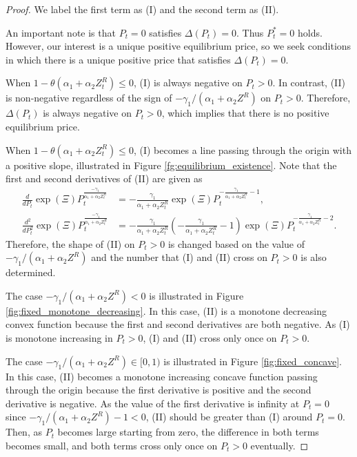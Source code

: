 \documentclass[11pt, a4paper]{article}
\theoremstyle{remark}
\begin{document}
\begin{proof}
We label the first term as (I) and the second term as (II).

An important note is that $P_t =0$ satisfies $\Delta(P_{t}) = 0$.
Thus $P_t^* = 0$ holds.
However, our interest is a unique positive equilibrium price, so we seek conditions in which there is a unique positive price that satisfies $\Delta(P_t)=0$.
    
When $1 - \theta (\alpha_1 + \alpha_2 Z^{R}_{t}) \le 0$, (I) is always negative on $P_t >0$. 
In contrast, (II) is non-negative regardless of the sign of $-\gamma_1/(\alpha_1+\alpha_2 Z^R)$ on $P_t > 0$.
Therefore, $\Delta(P_t)$ is always negative on $P_t>0$, which implies that there is no positive equilibrium price.

When $1 - \theta (\alpha_1 + \alpha_2 Z^{R}_{t}) \le 0$, (I) becomes a line passing through the origin with a positive slope, illustrated in Figure \ref{fg:equilibrium_existence}. 
Note that the first and second derivatives of (II) are given as
\begin{align}
    \frac{d}{dP_t}\exp(\Xi) P_t^{\frac{-\gamma_1}{\alpha_1 + \alpha_2 Z^{R}_{t}}} &= -\frac{\gamma_1}{\alpha_1 + \alpha_2 Z^R_t} \exp(\Xi)P_t^{-\frac{\gamma_1}{\alpha_1 + \alpha_2 Z^R_t} - 1},\\
    \frac{d^2}{dP_t^2} \exp(\Xi) P_t^{\frac{-\gamma_1}{\alpha_1 + \alpha_2 Z^{R}_{t}}} &= -\frac{\gamma_1}{\alpha_1 + \alpha_2 Z^R_t}\left(-\frac{\gamma_1}{\alpha_1 + \alpha_2 Z^R_t} - 1\right) \exp(\Xi) P_t^{-\frac{\gamma_1}{\alpha_1 + \alpha_2 Z^R_t} - 2}.
\end{align}
Therefore, the shape of (II) on $P_t >0$ is changed based on the value of $-\gamma_1/(\alpha_1+\alpha_2 Z^R)$ and the number that (I) and (II) cross on $P_t >0$ is also determined.

The case $-\gamma_1/(\alpha_1+\alpha_2 Z^R) < 0$ is illustrated in Figure \ref{fig:fixed_monotone_decreasing}. In this case, (II) is a monotone decreasing convex function because the first and second derivatives are both negative. As (I) is monotone increasing in $P_t >0$, (I) and (II) cross only once on $P_t >0$.

The case $-\gamma_1/(\alpha_1+\alpha_2 Z^R) \in [0, 1)$ is illustrated in Figure \ref{fig:fixed_concave}. In this case, (II) becomes a monotone increasing concave function passing through the origin because the first derivative is positive and the second derivative is negative.
As the value of the first derivative is infinity at $P_t = 0$ since $-\gamma_1/(\alpha_1+\alpha_2 Z^R)-1<0$, (II) should be greater than (I) around $P_t = 0$. 
Then, as $P_t$ becomes large starting from zero, the difference in both terms becomes small, and both terms cross only once on $P_t >0$ eventually.


\end{proof}
\end{document}
